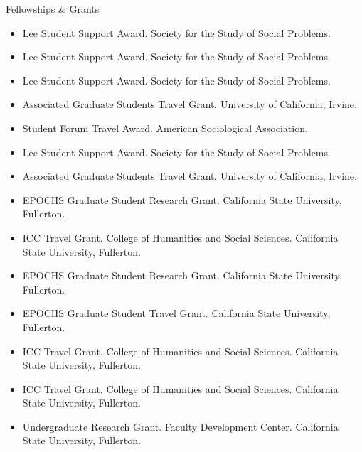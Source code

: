 \documentclass{resume} %
\newenvironment{hangt}[1]
 {\par\vspace{-\parsep}%
  \begin{itemize}[label={#1\ \quad},leftmargin=*,labelsep=0pt]
  \raggedright
  \item\relax
  \vspace*{8pt}
  }
 {\end{itemize}}
\newcommand{\datefill}{\quad \hspace{12pt}}
\begin{document}
\begin{rSection}{Fellowships \& Grants}
\begin{hangt}{2018 \datefill}
Lee Student Support Award. Society for the Study of Social Problems. %
\end{hangt}
\begin{hangt}{2017 \datefill}
Lee Student Support Award. Society for the Study of Social Problems. %
\end{hangt}
\begin{hangt}{2016 \datefill}
Lee Student Support Award. Society for the Study of Social Problems. %
\end{hangt}
\begin{hangt}{2015 \datefill}
Associated Graduate Students Travel Grant. University of California, Irvine. %
\end{hangt}
\begin{hangt}{2015 \datefill}
Student Forum Travel Award. American Sociological Association. %
\end{hangt}
\begin{hangt}{2015 \datefill}
Lee Student Support Award. Society for the Study of Social Problems. %
\end{hangt}
\begin{hangt}{2014 \datefill}
Associated Graduate Students Travel Grant. University of California, Irvine. %
\end{hangt}
\begin{hangt}{2012 \datefill}
EPOCHS Graduate Student Research Grant. California State University, Fullerton. %
\end{hangt}
\begin{hangt}{2011 \datefill}
ICC Travel Grant. College of Humanities and Social Sciences. California State University, Fullerton. %
\end{hangt}
\begin{hangt}{2011 \datefill}
EPOCHS Graduate Student Research Grant. California State University, Fullerton. %
\end{hangt}
\begin{hangt}{2011 \datefill}
EPOCHS Graduate Student Travel Grant. California State University, Fullerton. %
\end{hangt}
\begin{hangt}{2011 \datefill}
ICC Travel Grant. College of Humanities and Social Sciences. California State University, Fullerton. %
\end{hangt}
\begin{hangt}{2010 \datefill}
ICC Travel Grant. College of Humanities and Social Sciences. California State University, Fullerton. %
\end{hangt}
\begin{hangt}{2009 \datefill}
Undergraduate Research Grant. Faculty Development Center. California State University, Fullerton. %
\end{hangt}

\end{rSection}
\end{document}
